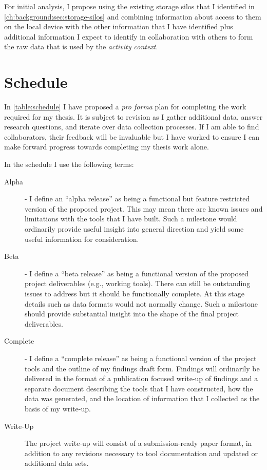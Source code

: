 For initial analysis, I propose using the existing storage silos that I
identified in \autoref{ch:background:sec:storage-silos} and combining
information about access to them on the local device with the other information
that I have identified plus additional information I expect to identify in
collaboration with others to form the raw data that is used by the
\emph{activity context}.

\section{Schedule}
\label{plan:schedule}



In \autoref{table:schedule} I have proposed a \emph{pro forma} plan for
completing the work required for my thesis.  It is subject to revision as I
gather additional data, answer research questions, and iterate over data
collection processes.  If I am able to find collaborators, their feedback will
be invaluable but I have worked to ensure I can make forward progress towards
completing my thesis work alone.

In the schedule I use the following terms:

\begin{description}
    \item[Alpha] - I define an ``alpha release'' as being a functional but
        feature restricted version of the proposed project.  This may mean there are
        known issues and limitations with the tools that I have built.  Such a
        milestone would ordinarily provide useful insight into general direction and
        yield some useful information for consideration.

    \item[Beta] - I define a ``beta release'' as being a functional version of
        the proposed project deliverables (e.g., working tools).  There can still be
        outstanding issues to address but it should be functionally complete.  At
        this stage details such as data formats would not normally change. Such a
        milestone should provide substantial insight into the shape of the final
        project deliverables.

    \item[Complete] - I define a ``complete release'' as being a functional
        version of the project tools and the outline of my findings draft form.
        Findings will ordinarily be delivered in the format of a publication focused
        write-up of findings and a separate document describing the tools that I
        have constructed, how the data was generated, and the location of
        information that I collected as the basis of my write-up.

    \item[Write-Up] The project write-up will consist of a submission-ready
        paper format, in addition to any revisions necessary to tool documentation
        and updated or additional data sets.

\end{description}

